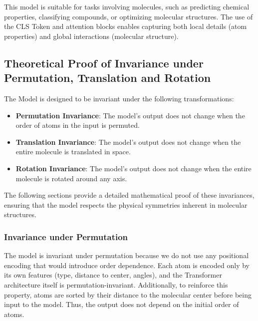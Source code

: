 \documentclass{article}
\begin{document}
This model is suitable for tasks involving molecules, such as predicting chemical properties, classifying compounds, or optimizing molecular structures. The use of the CLS Token and attention blocks enables capturing both local details (atom properties) and global interactions (molecular structure). \newline




\subsection{Theoretical Proof of Invariance under Permutation, Translation and Rotation }


\vspace{0.2cm}
The Model is designed to be invariant under the following transformations:
\vspace{0.2cm}
\begin{itemize}
  \item \textbf{Permutation Invariance}: The model's output does not change when the order of atoms in the input is permuted.
  \vspace{0.0005cm}
  \item \textbf{Translation Invariance}: The model's output does not change when the entire molecule is translated in space.
  \vspace{0.2cm}
  \item \textbf{Rotation Invariance}: The model's output does not change when the entire molecule is rotated around any axis.
    \vspace{0.2cm}
\end{itemize}

The following sections provide a detailed mathematical proof of these invariances, ensuring that the model respects the physical symmetries inherent in molecular structures.

\vspace{0.2cm}



\subsubsection{Invariance under Permutation}

The model is invariant under permutation because we do not use any positional encoding that would introduce order dependence. Each atom is encoded only by its own features (type, distance to center, angles), and the Transformer architecture itself is permutation-invariant. Additionally, to reinforce this property, atoms are sorted by their distance to the molecular center before being input to the model. Thus, the output does not depend on the initial order of atoms.
\end{document}
